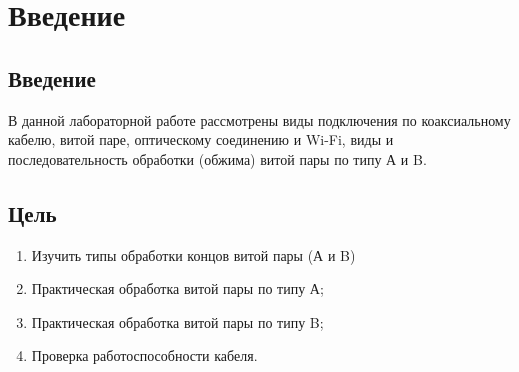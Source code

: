 \chapter{Введение}
\label{ch:intro}

\section{Введение}
В данной лабораторной работе рассмотрены виды подключения по коаксиальному кабелю,
витой паре, оптическому соединению и Wi-Fi, виды и последовательность обработки (обжима)
витой пары по типу А и B.

\section{Цель}  

\begin{enumerate}
    \item Изучить типы обработки концов витой пары (А и B)
    \item Практическая обработка витой пары по типу А;
    \item Практическая обработка витой пары по типу B;
    \item Проверка работоспособности кабеля.
\end{enumerate}
  
\endinput 